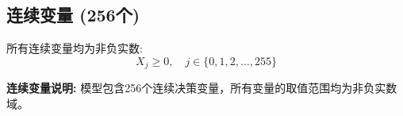\documentclass[a4paper,10pt]{article}
\begin{document}
\subsection{连续变量 (256个)}

所有连续变量均为非负实数:
\begin{equation}
X_j \geq 0, \quad j \in \{0, 1, 2, \ldots, 255\}
\end{equation}

\textbf{连续变量说明:} 模型包含256个连续决策变量，所有变量的取值范围均为非负实数域。
\end{document}
